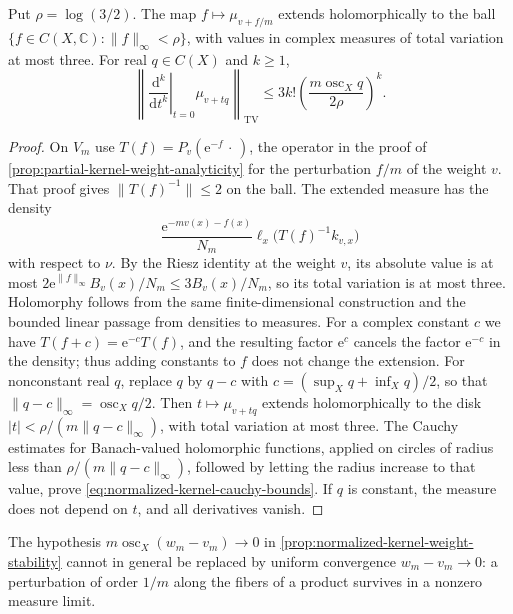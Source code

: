 \begin{proposition}\label{prop:normalized-kernel-uniform-radius}
Put $\rho=\log(3/2)$. The map $f\mapsto\mu_{v+f/m}$ extends holomorphically to the ball $\{f\in C(X,\mathbb C):\|f\|_\infty<\rho\}$, with values in complex measures of total variation at most three. For real $q\in C(X)$ and $k\geq1$,
\begin{equation}\label{eq:normalized-kernel-cauchy-bounds}
 \left\|\left.\frac{\mathrm{d}^k}{\mathrm{d}t^k}\right|_{t=0}
                      \mu_{v+tq}\right\|_{\mathrm{TV}}
 \leq3k!\left(\frac{m\operatorname{osc}_Xq}{2\rho}\right)^k.
\end{equation}
\end{proposition}
\begin{proof}
On $V_m$ use $T(f)=P_v(\mathrm{e}^{-f}\,\cdot\,)$, the operator in the proof of \cref{prop:partial-kernel-weight-analyticity} for the perturbation $f/m$ of the weight $v$. That proof gives $\|T(f)^{-1}\|\leq2$ on the ball. The extended measure has the density
\[
 \frac{\mathrm{e}^{-mv(x)-f(x)}}{N_m}
         \ell_x\bigl(T(f)^{-1}k_{v,x}\bigr)
\]
with respect to $\nu$. By the Riesz identity at the weight $v$, its absolute value is at most
$2\mathrm{e}^{\|f\|_\infty}B_v(x)/N_m\leq3B_v(x)/N_m$, so its total variation is at most three. Holomorphy follows from the same finite-dimensional construction and the bounded linear passage from densities to measures. For a complex constant $c$ we have $T(f+c)=\mathrm{e}^{-c}T(f)$, and the resulting factor $\mathrm{e}^{c}$ cancels the factor $\mathrm{e}^{-c}$ in the density; thus adding constants to $f$ does not change the extension. For nonconstant real $q$, replace $q$ by $q-c$ with $c=(\sup_Xq+\inf_Xq)/2$, so that $\|q-c\|_\infty=\operatorname{osc}_Xq/2$. Then $t\mapsto\mu_{v+tq}$ extends holomorphically to the disk $|t|<\rho/(m\|q-c\|_\infty)$, with total variation at most three. The Cauchy estimates for Banach-valued holomorphic functions, applied on circles of radius less than $\rho/(m\|q-c\|_\infty)$, followed by letting the radius increase to that value, prove \eqref{eq:normalized-kernel-cauchy-bounds}. If $q$ is constant, the measure does not depend on $t$, and all derivatives vanish.
\end{proof}

The hypothesis $m\operatorname{osc}_X(w_m-v_m)\to0$ in \cref{prop:normalized-kernel-weight-stability} cannot in general be replaced by uniform convergence $w_m-v_m\to0$: a perturbation of order $1/m$ along the fibers of a product survives in a nonzero measure limit.

